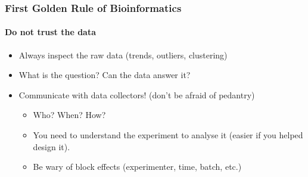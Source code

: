 \documentclass[table]{beamer}
\begin{document}
  \begin{frame}
    \frametitle{First Golden Rule of Bioinformatics}
    \framesubtitle{Do not trust the data}
	\begin{itemize}
	  \item Always inspect the raw data (trends, outliers, clustering)
	  \item What is the question? Can the data answer it?
	  \item Communicate with data collectors! (don't be afraid of pedantry)
	  \begin{itemize}
	    \item Who? When? How?
	    \item You need to understand the experiment to analyse it (easier if you helped design it).
	    \item Be wary of block effects (experimenter, time, batch, etc.)
	  \end{itemize}
	\end{itemize}
  \end{frame}
\end{document}
